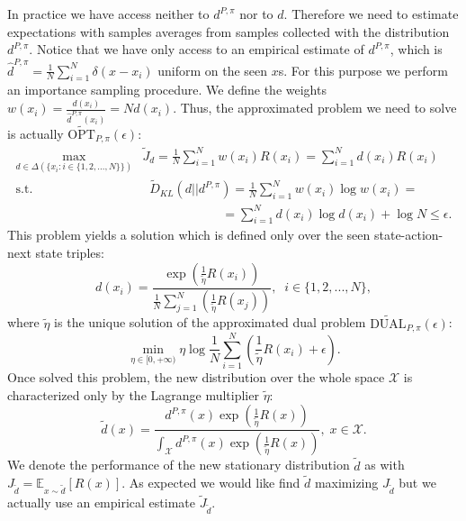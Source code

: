 In practice we have access neither to $d^{P,\pi}$ nor to $d$. Therefore we need to estimate expectations with samples averages from samples collected with the distribution $d^{P,	\pi}$. Notice that we have only access to an empirical estimate of $d^{P,	\pi}$, which is $\widehat{d}^{P,	\pi} = \frac{1}{N} \sum_{i=1}^{N} \delta(x - x_i)$ uniform on the seen $x$s. For this purpose we perform an importance sampling procedure. We define the weights $w(x_i) = \frac{d(x_i)}{\widehat{d}^{P,\pi}(x_i)} = N d(x_i)$. Thus, the approximated problem we need to solve is actually $\widetilde{\text{OPT}}_{P,\pi}(\epsilon)$:
\begin{align}
\max_{d \in \Delta(\{x_i : i \in \{1,2,...,N\} \} )} & \widetilde{J}_d = \frac{1}{N} \sum_{i=1}^N w(x_i) R(x_i) = \sum_{i=1}^N d(x_i) R(x_i) \\
\text{s.t.} & \; \; \widetilde{D}_{KL}(d||d^{P,\pi}) = \frac{1}{N} \sum_{i=1}^N w(x_i) \log w(x_i) = \\ & \qquad \qquad \qquad \; = \sum_{i=1}^N d(x_i) \log d(x_i) + \log N \leq \epsilon .
\end{align}
This problem yields a solution which is defined only over the seen state-action-next state triples:
\begin{equation}
	d(x_i) = \frac{\exp \left( \frac{1}{\widetilde{\eta}} R(x_i) \right)}{\frac{1}{N}\sum_{j=1}^N \left( \frac{1}{\widetilde{\eta}} R(x_j) \right)} , \; \; i \in \{1,2,..., N\},
\end{equation}
where $\widetilde{\eta}$ is the unique solution of the approximated dual problem $\widetilde{\text{DUAL}}_{P,\pi}(\epsilon)$:
\begin{equation}
	\min_{\eta \in [0,+\infty)} \eta \log \frac{1}{N} \sum_{i=1}^N \left( \frac{1}{\widetilde{\eta}} R(x_i) + \epsilon \right) .
\end{equation}
Once solved this problem, the new distribution over the whole space $\mathcal{X}$ is characterized only by the Lagrange multiplier $\widetilde{\eta}$:
\begin{equation}
	\widetilde{d}(x) = \frac{d^{P,\pi}(x) \exp \left( \frac{1}{\widetilde{\eta}} R(x) \right)}{\int_{\mathcal{X}} d^{P,\pi}(x) \exp \left( \frac{1}{\widetilde{\eta}} R(x) \right)} , \; x \in \mathcal{X} .
\end{equation}
We denote the performance of the new stationary distribution $\widetilde{d}$ as with $J_{\widetilde{d}}= \mathbb{E}_{x \sim \widetilde{d}} \left[ R (x) \right]$. As expected we would like find $\widetilde{d}$ maximizing $J_{\widetilde{d}}$ but we actually use an empirical estimate $\widetilde{J}_{\widetilde{d}}$.

